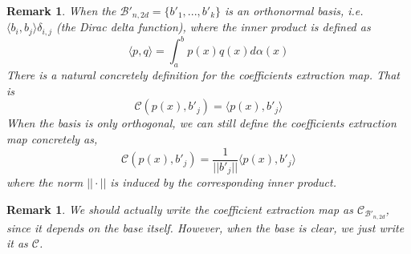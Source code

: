 \documentclass[12pt]{amsart}
\numberwithin{equation}{section}
\newtheorem{remark}[thm]{Remark}
\theoremstyle{definition}
\numberwithin{thm}{section}
\begin{document}
\begin{remark}
     When the $\mathcal{B'}_{n, 2d} = \{b'_1,... ,b'_k\}$ is an orthonormal basis, 
     i.e. $\langle b_i, b_j \rangle \delta_{i,j}$ (the Dirac delta function), where the inner product is defined as
     \begin{equation*} 
          \langle p, q \rangle = \int_a^b p(x) q(x) d\alpha(x)
     \end{equation*}
     There is a natural concretely definition for the \emph{coefficients extraction map}. 
     That is
     \begin{equation*}
          \mathcal{C}(p(x), b'_j) = \langle p(x), b'_j \rangle
     \end{equation*}
     When the basis is only orthogonal, we can still define the \emph{coefficients extraction map} concretely as,
     \begin{equation*}
          \mathcal{C}(p(x), b'_j) = \frac{1}{||b'_j||}\langle p(x), b'_j \rangle 
     \end{equation*}
     where the norm $|| \cdot ||$ is induced by the corresponding inner product.
\end{remark}

\begin{remark}
     We should actually write the {coefficient extraction map} as $\mathcal{C}_{\mathcal{B'}_{n,2d}}$,
     since it depends on the base itself. However, when the base is clear, we just write it as $\mathcal{C}$.
\end{remark}
\end{document}
